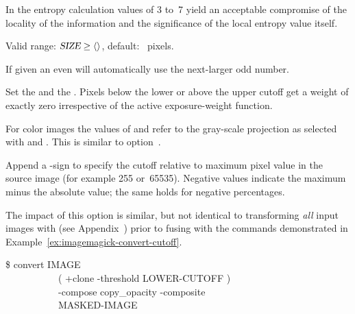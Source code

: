 \begin{codelist}
  In the entropy calculation  values of 3 to~7 yield an
  acceptable compromise of the locality of the information and the
  significance of the local entropy value itself.

  Valid range: $\metavar{SIZE} \geq
  \val{val:minimum-entropy-window-size}$, default:
  ~pixels.

  If given an even  \App{} will automatically use the
  next-larger odd number.


  \label{opt:exposure-cutoff}%
\item[\itempar{--exposure-cutoff=\metavar{LOWER-CUTOFF}\optional{:\feasiblebreak
      \metavar{UPPER\hyp{}CUTOFF}\optional{:\feasiblebreak
        \metavar{LOWER\hyp{}PROJECTOR}:\feasiblebreak
        \metavar{UPPER\hyp{}PROJECTOR}}}}]\itemend
  Set the  and the .
  Pixels below the lower or above the upper cutoff get a weight of
  exactly zero irrespective of the active exposure-weight function.

  For color images the values of  and
   refer to the gray-scale projection as
  selected with  and
  .  This is similar to
  option~.

  Append a \sample{\%}-sign to specify the cutoff relative to maximum
  pixel value in the source image (for example 255 or~65535).
  Negative  values indicate the maximum minus
  the absolute  value; the same holds for
  negative percentages.

  The impact of this option is similar, but not identical to
  transforming \emph{all} input images with
   (see
  Appendix~) prior to fusing with the
  commands demonstrated in
  Example~\ref{ex:imagemagick-convert-cutoff}.

  \begin{exemplar}[htbp]
    \begin{terminal}
      \$ convert IMAGE \bslash \\
      ~~~~~~~~~~~\bslash( +clone -threshold LOWER-CUTOFF \bslash) \bslash \\
      ~~~~~~~~~~~-compose copy\_opacity -composite \bslash \\
      ~~~~~~~~~~~MASKED-IMAGE
    \end{terminal}


\end{exemplar}
\end{codelist}
